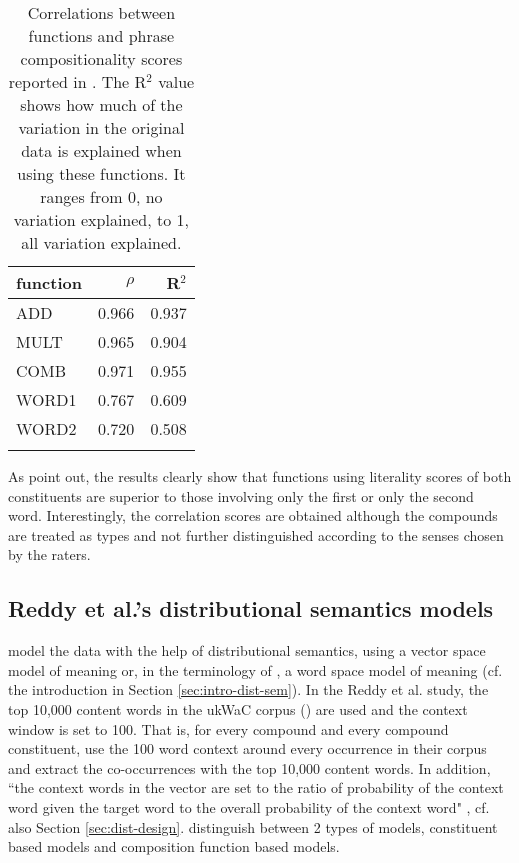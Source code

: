 \begin{table}[!htb]
  \centering
\begin{tabular}[h]{lrr}\lsptoprule
  function&$\rho$&R$^2$\\\midrule
ADD&0.966&0.937\\
MULT&0.965&0.904\\
COMB&0.971&0.955\\
WORD1&0.767&0.609\\
WORD2&0.720&0.508\\\lspbottomrule
\end{tabular}
    \caption{Correlations between functions and phrase compositionality scores reported in \citet{Reddyetal:2011}. The R$^2$ value shows how much of the variation in the original data is explained when using these functions. It ranges from 0, no variation explained, to 1, all variation explained.}
\label{tab:reddy-cor-tran}
\end{table}

As \citeauthor{Reddyetal:2011} point out, the results clearly show that functions
using literality scores of
both constituents are superior to those involving only the first or only the second word. Interestingly, the correlation scores are obtained although the
compounds are treated as types and not further distinguished according
to the senses chosen by the raters. %
\subsection{Reddy et al.'s distributional semantics models}
\label{sec:reddy-distrib-models}
\citeauthor{Reddyetal:2011} model the data with the help of distributional
semantics, using a vector space model of meaning or, in the
terminology of \citet{Sahlgren:2006}, a word space model of meaning
(cf. the introduction in Section \ref{sec:intro-dist-sem}). 
In the Reddy et al. study, the top 10,000
content words in the ukWaC corpus (\citealt{Ferraresietal:2008}) are used and the context window is set to
100. That is, for every compound and every compound constituent,
\citet{Reddyetal:2011} use the 100 word context around every
occurrence in their corpus and extract the co-occurrences with the top 10,000
content words. In addition, ``the context words in the vector are set to the ratio of probability of the context
word given the target word to the overall probability of the context
word" \citep[215]{Reddyetal:2011}, cf. also Section \ref{sec:dist-design}.  
\citet{Reddyetal:2011} distinguish between 2 types of models,
constituent based models and composition function
based models. 


